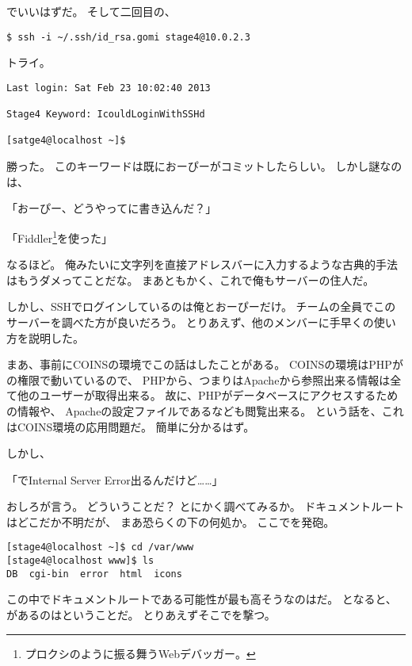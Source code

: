 \begin{multicols}{2}

でいいはずだ。
そして二回目の、

\begin{lstlisting}
$ ssh -i ~/.ssh/id_rsa.gomi stage4@10.0.2.3
\end{lstlisting}

トライ。

\begin{lstlisting}
Last login: Sat Feb 23 10:02:40 2013

Stage4 Keyword: IcouldLoginWithSSHd

[satge4@localhost ~]$
\end{lstlisting}

勝った。
このキーワードは既におーぴーがコミットしたらしい。
しかし謎なのは、

「おーぴー、どうやってに書き込んだ？」

「Fiddler\footnote{プロクシのように振る舞うWebデバッガー。}を使った」

なるほど。
俺みたいに文字列を直接アドレスバーに入力するような古典的手法はもうダメってことだな。
まあともかく、これで俺もサーバーの住人だ。

しかし、SSHでログインしているのは俺とおーぴーだけ。
チームの全員でこのサーバーを調べた方が良いだろう。
とりあえず、他のメンバーに手早くの使い方を説明した。

まあ、事前にCOINSの環境でこの話はしたことがある。
COINSの環境はPHPがの権限で動いているので、
PHPから、つまりはApacheから参照出来る情報は全て他のユーザーが取得出来る。
故に、PHPがデータベースにアクセスするための情報や、
Apacheの設定ファイルであるなども閲覧出来る。
という話を、これはCOINS環境の応用問題だ。
簡単に分かるはず。

しかし、

「でInternal Server Error出るんだけど……」

おしろが言う。
どういうことだ？
とにかく調べてみるか。
ドキュメントルートはどこだか不明だが、
まあ恐らくの下の何処か。
ここでを発砲。

\begin{lstlisting}
[stage4@localhost ~]$ cd /var/www
[stage4@localhost www]$ ls
DB  cgi-bin  error  html  icons
\end{lstlisting}

この中でドキュメントルートである可能性が最も高そうなのはだ。
となると、があるのはということだ。
とりあえずそこでを撃つ。


\end{multicols}
